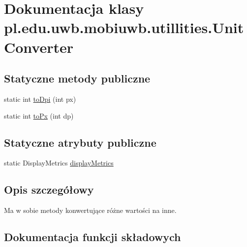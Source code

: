\hypertarget{classpl_1_1edu_1_1uwb_1_1mobiuwb_1_1utillities_1_1_unit_converter}{}\section{Dokumentacja klasy pl.\+edu.\+uwb.\+mobiuwb.\+utillities.\+Unit\+Converter}
\label{classpl_1_1edu_1_1uwb_1_1mobiuwb_1_1utillities_1_1_unit_converter}
\subsection*{Statyczne metody publiczne}
\begin{DoxyCompactItemize}
\item 
static int \hyperlink{classpl_1_1edu_1_1uwb_1_1mobiuwb_1_1utillities_1_1_unit_converter_ac3713b5c3b22c4a38de12028d414875e}{to\+Dpi} (int px)
\item 
static int \hyperlink{classpl_1_1edu_1_1uwb_1_1mobiuwb_1_1utillities_1_1_unit_converter_a2045106f8abf0a567e2bb385bdd3eeaa}{to\+Px} (int dp)
\end{DoxyCompactItemize}
\subsection*{Statyczne atrybuty publiczne}
\begin{DoxyCompactItemize}
\item 
static Display\+Metrics \hyperlink{classpl_1_1edu_1_1uwb_1_1mobiuwb_1_1utillities_1_1_unit_converter_ae33325b0005ac2d239fc4f7d5943af78}{display\+Metrics}
\end{DoxyCompactItemize}


\subsection{Opis szczegółowy}
Ma w sobie metody konwertujące różne wartości na inne. 

\subsection{Dokumentacja funkcji składowych}
\hypertarget{classpl_1_1edu_1_1uwb_1_1mobiuwb_1_1utillities_1_1_unit_converter_ac3713b5c3b22c4a38de12028d414875e}{}
